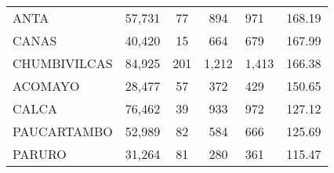 \begin{tabular}{lrcclr}
	\cellcolor[HTML]{FFFF99}ANTA                                   & 57,731                                                         & 77                                                         & 894                  & 971                                                                 & 168.19                                                                       \\
	\cellcolor[HTML]{FFFF99}CANAS                                  & 40,420                                                         & 15                                                         & 664                  & 679                                                                 & 167.99                                                                       \\
	\cellcolor[HTML]{C6E0B4}CHUMBIVILCAS                           & 84,925                                                         & 201                                                        & 1,212                & 1,413                                                               & 166.38                                                                       \\
	\cellcolor[HTML]{C6E0B4}ACOMAYO                                & 28,477                                                         & 57                                                         & 372                  & 429                                                                 & 150.65                                                                       \\
	\cellcolor[HTML]{C6E0B4}CALCA                                  & 76,462                                                         & 39                                                         & 933                  & 972                                                                 & 127.12                                                                       \\
	\cellcolor[HTML]{C6E0B4}PAUCARTAMBO                            & 52,989                                                         & 82                                                         & 584                  & 666                                                                 & 125.69                                                                       \\
	\cellcolor[HTML]{C6E0B4}PARURO                                 & 31,264                                                         & 81                                                         & 280                  & 361                                                                 & 115.47                                                                       \\

\end{tabular}
